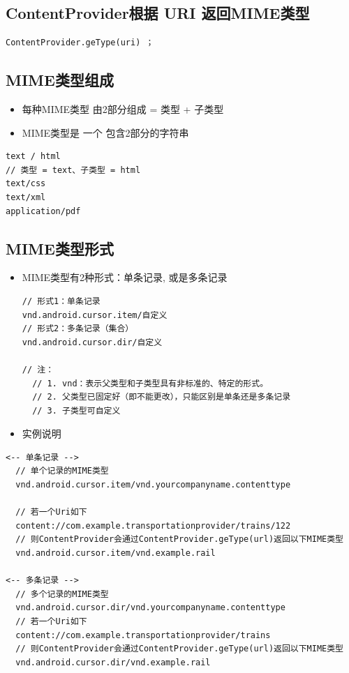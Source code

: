 \documentclass[9pt, b5paaper]{book}
\begin{document}
\subsection{ContentProvider根据 URI 返回MIME类型}
\label{sec-5-2-1}
\begin{verbatim}
ContentProvider.geType(uri) ；
\end{verbatim}
\subsection{MIME类型组成}
\label{sec-5-2-2}
\begin{itemize}
\item 每种MIME类型 由2部分组成 = 类型 + 子类型
\item MIME类型是 一个 包含2部分的字符串
\end{itemize}
\begin{verbatim}
text / html
// 类型 = text、子类型 = html
text/css
text/xml
application/pdf
\end{verbatim}

\subsection{MIME类型形式}
\label{sec-5-2-3}
\begin{itemize}
\item MIME类型有2种形式：单条记录, 或是多条记录
\begin{verbatim}
// 形式1：单条记录  
vnd.android.cursor.item/自定义
// 形式2：多条记录（集合）
vnd.android.cursor.dir/自定义 

// 注：
  // 1. vnd：表示父类型和子类型具有非标准的、特定的形式。
  // 2. 父类型已固定好（即不能更改），只能区别是单条还是多条记录
  // 3. 子类型可自定义
\end{verbatim}
\item 实例说明
\end{itemize}
\begin{verbatim}
<-- 单条记录 -->
  // 单个记录的MIME类型
  vnd.android.cursor.item/vnd.yourcompanyname.contenttype 

  // 若一个Uri如下
  content://com.example.transportationprovider/trains/122   
  // 则ContentProvider会通过ContentProvider.geType(url)返回以下MIME类型
  vnd.android.cursor.item/vnd.example.rail

<-- 多条记录 -->
  // 多个记录的MIME类型
  vnd.android.cursor.dir/vnd.yourcompanyname.contenttype 
  // 若一个Uri如下
  content://com.example.transportationprovider/trains 
  // 则ContentProvider会通过ContentProvider.geType(url)返回以下MIME类型
  vnd.android.cursor.dir/vnd.example.rail
\end{verbatim}
\end{document}
